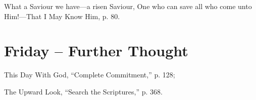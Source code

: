 \documentclass[a4paper, 10pt, twoside, headings=small]{scrartcl}
\begin{document}
\begin{multicols}{2}
What a Saviour we have—a risen Saviour, One who can save all who come unto Him!—That I May Know Him, p. 80.

\section*{Friday – Further Thought}

\setlength{\parindent}{0pt}This Day With God, “Complete Commitment,” p. 128;

The Upward Look, “Search the Scriptures,” p. 368.

\end{multicols}
\end{document}
